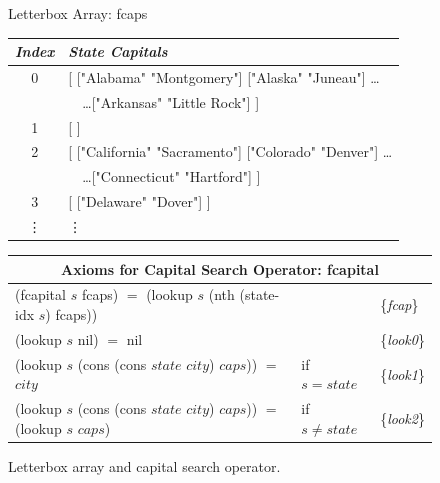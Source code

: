 \begin{figure}
\begin{center}
Letterbox Array: \textsf{fcaps}
\begin{tabular}{c|l}
\emph{Index} &\emph{State Capitals} \\
\hline
0 & \textsf{[ ["Alabama"  "Montgomery"] ["Alaska"   "Juneau"] \dots } \\
  & \textsf{~~\dots ["Arkansas"  "Little Rock"] ]}  \\ %
1 & \textsf{[ ]}\\
2 & \textsf{[ ["California"  "Sacramento"] ["Colorado"  "Denver"] \dots } \\
  & \textsf{~~\dots ["Connecticut"  "Hartford"] }]\\
3 & \textsf{[ ["Delaware"  "Dover"] ]}\\
\vdots & \hspace*{15mm}\vdots\\
\end{tabular}
\begin{tabular}{lll}
\multicolumn{3}{c}{Axioms for Capital Search Operator: \textsf{fcapital}}\\
\hline
\textsf{(fcapital} $s$ \textsf{fcaps)} $=$ \textsf{(lookup} $s$ \textsf{(nth (state-idx} $s$) \textsf{fcaps))} && \{\emph{fcap}\} \\
\textsf{(lookup} $s$ \textsf{nil)} $=$ \textsf{nil}  && \{\emph{look0}\}     \\
\textsf{(lookup} $s$ \textsf{(cons (cons} $state$ $city$\textsf{)} $caps$\textsf{))} $=$ $city$ &if $s = state$ & \{\emph{look1}\} \\
\textsf{(lookup} $s$ \textsf{(cons (cons} $state$ $city$) $caps$\textsf{))} $=$ \textsf{(lookup} $s$ $caps$\textsf{)} &if $s \ne state$ & \{\emph{look2}\} \\
\end{tabular}
\end{center}
\caption{Letterbox array and capital search operator.}
\label{fig:fcaps-array}
\end{figure}

